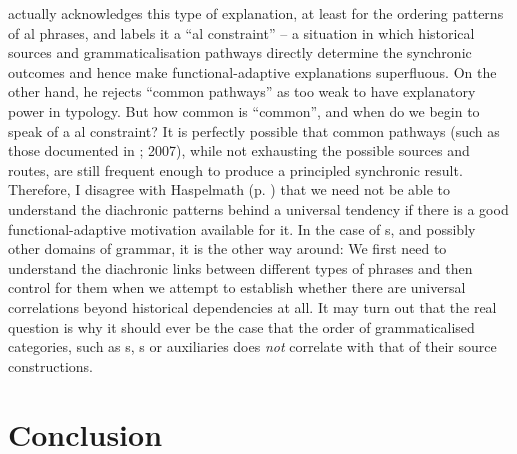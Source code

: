 \documentclass[output=paper]{langsci/langscibook}
\begin{document}
 actually acknowledges this type of explanation, at least for the ordering patterns of al phrases, and labels it a “al constraint” – a situation in which historical sources and grammaticalisation pathways directly determine the synchronic outcomes and hence make functional-adaptive explanations superfluous. On the other hand, he rejects “common pathways” as too weak to have explanatory power in typology. But how common is “common”, and when do we begin to speak of a al constraint? It is perfectly possible that common pathways (such as those documented in \citealt{HeineKuteva2002}; 2007), while not exhausting the possible sources and routes, are still frequent enough to produce a principled synchronic result. Therefore, I disagree with Haspelmath (p. \pageref{Haspelmathchapterpageref}) that we need not be able to understand the diachronic patterns behind a universal tendency if there is a good functional-adaptive motivation available for it. In the case of s, and possibly other domains of grammar, it is the other way around: We first need to understand the diachronic links between different types of phrases and then control for them when we attempt to establish whether there are universal correlations beyond historical dependencies at all. It may turn out that the real question is why it should ever be the case that the order of grammaticalised categories, such as s, s or auxiliaries does \textit{not} correlate with that of their source constructions.

\section{Conclusion}
\end{document}
